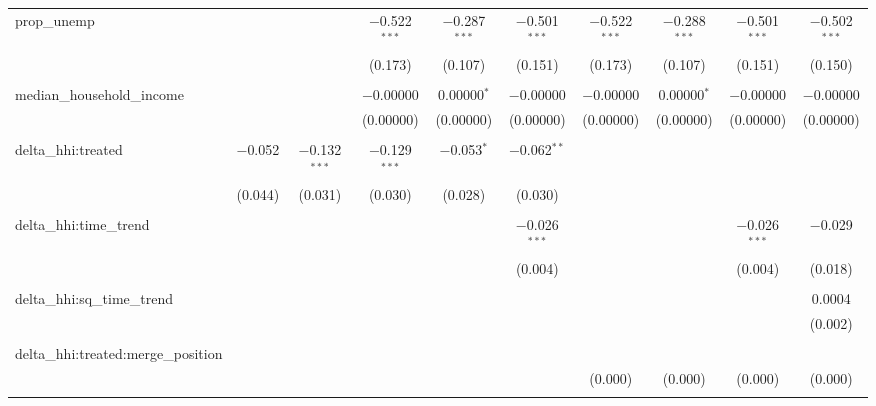 \begin{table}[H]
{\begin{tabular}{@{\extracolsep{5pt}}lccccccccc}
  prop\_unemp &  &  & $-$0.522$^{***}$ & $-$0.287$^{***}$ & $-$0.501$^{***}$ & $-$0.522$^{***}$ & $-$0.288$^{***}$ & $-$0.501$^{***}$ & $-$0.502$^{***}$ \\  

   &  &  & (0.173) & (0.107) & (0.151) & (0.173) & (0.107) & (0.151) & (0.150) \\  

   & & & & & & & & & \\  

  median\_household\_income &  &  & $-$0.00000 & 0.00000$^{*}$ & $-$0.00000 & $-$0.00000 & 0.00000$^{*}$ & $-$0.00000 & $-$0.00000 \\  

   &  &  & (0.00000) & (0.00000) & (0.00000) & (0.00000) & (0.00000) & (0.00000) & (0.00000) \\  

   & & & & & & & & & \\  

  delta\_hhi:treated & $-$0.052 & $-$0.132$^{***}$ & $-$0.129$^{***}$ & $-$0.053$^{*}$ & $-$0.062$^{**}$ &  &  &  &  \\  

   & (0.044) & (0.031) & (0.030) & (0.028) & (0.030) &  &  &  &  \\  

   & & & & & & & & & \\  

  delta\_hhi:time\_trend &  &  &  &  & $-$0.026$^{***}$ &  &  & $-$0.026$^{***}$ & $-$0.029 \\  

   &  &  &  &  & (0.004) &  &  & (0.004) & (0.018) \\  

   & & & & & & & & & \\  

  delta\_hhi:sq\_time\_trend &  &  &  &  &  &  &  &  & 0.0004 \\  

   &  &  &  &  &  &  &  &  & (0.002) \\  

   & & & & & & & & & \\  

  delta\_hhi:treated:merge\_position &  &  &  &  &  &  &  &  &  \\  

   &  &  &  &  &  & (0.000) & (0.000) & (0.000) & (0.000) \\  

   & & & & & & & & & \\  


\end{tabular}}
\end{table}
